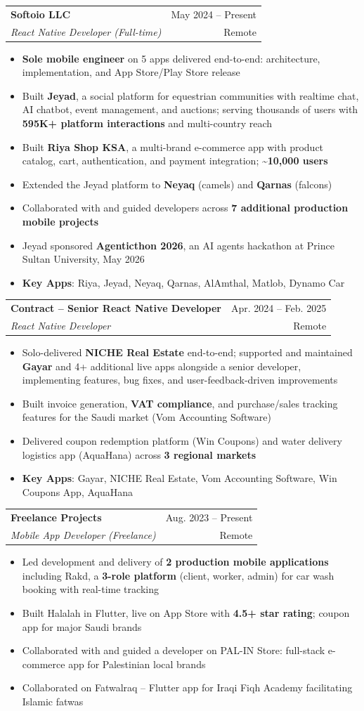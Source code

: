 \documentclass[letterpaper,11pt]{article}
\makeatletter
\newcommand{\resumeItem}[1]{
  \item\small{
    {#1 \vspace{-1pt}}
  }
}
\newcommand{\resumeSubheading}[4]{
  \vspace{-1pt}\item
    \begin{tabular*}{\textwidth}[t]{l@{\extracolsep{\fill}}r}
      \textbf{#1} & {\color{dark-grey}\small #2}\vspace{1pt}\\
      \textit{#3} & {\color{dark-grey} \small #4}\\
    \end{tabular*}\vspace{-4pt}
}
\newcommand{\resumeItemListStart}{\begin{itemize}}
\newcommand{\resumeItemListEnd}{\end{itemize}\vspace{0pt}}
\makeatother
\begin{document}
    \resumeSubheading
      {Softoio LLC}{May 2024 -- Present}
      {React Native Developer (Full-time)}{Remote}
      \resumeItemListStart
        \resumeItem{\textbf{Sole mobile engineer} on 5 apps delivered end-to-end: architecture, implementation, and App Store/Play Store release}
        \resumeItem{Built \textbf{Jeyad}, a social platform for equestrian communities with realtime chat, AI chatbot, event management, and auctions; serving thousands of users with \textbf{595K+ platform interactions} and multi-country reach}
        \resumeItem{Built \textbf{Riya Shop KSA}, a multi-brand e-commerce app with product catalog, cart, authentication, and payment integration; \textbf{\textasciitilde10,000 users}}
        \resumeItem{Extended the Jeyad platform to \textbf{Neyaq} (camels) and \textbf{Qarnas} (falcons)}
        \resumeItem{Collaborated with and guided developers across \textbf{7 additional production mobile projects}}
        \resumeItem{Jeyad sponsored \textbf{Agenticthon 2026}, an AI agents hackathon at Prince Sultan University, May 2026}
        \resumeItem{\textbf{Key Apps}: Riya, Jeyad, Neyaq, Qarnas, AlAmthal, Matlob, Dynamo Car}
      \resumeItemListEnd

    \resumeSubheading
      {Contract -- Senior React Native Developer}{Apr. 2024 -- Feb. 2025}
      {React Native Developer}{Remote}
      \resumeItemListStart
        \resumeItem{Solo-delivered \textbf{NICHE Real Estate} end-to-end; supported and maintained \textbf{Gayar} and 4+ additional live apps alongside a senior developer, implementing features, bug fixes, and user-feedback-driven improvements}
        \resumeItem{Built invoice generation, \textbf{VAT compliance}, and purchase/sales tracking features for the Saudi market (Vom Accounting Software)}
        \resumeItem{Delivered coupon redemption platform (Win Coupons) and water delivery logistics app (AquaHana) across \textbf{3 regional markets}}
        \resumeItem{\textbf{Key Apps}: Gayar, NICHE Real Estate, Vom Accounting Software, Win Coupons App, AquaHana}
      \resumeItemListEnd

    \resumeSubheading
      {Freelance Projects}{Aug. 2023 -- Present}
      {Mobile App Developer (Freelance)}{Remote}
      \resumeItemListStart
        \resumeItem{Led development and delivery of \textbf{2 production mobile applications} including Rakd, a \textbf{3-role platform} (client, worker, admin) for car wash booking with real-time tracking}
        \resumeItem{Built Halalah in Flutter, live on App Store with \textbf{4.5+ star rating}; coupon app for major Saudi brands}
        \resumeItem{Collaborated with and guided a developer on PAL-IN Store: full-stack e-commerce app for Palestinian local brands}
        \resumeItem{Collaborated on Fatwalraq -- Flutter app for Iraqi Fiqh Academy facilitating Islamic fatwas}
      \resumeItemListEnd
\end{document}
